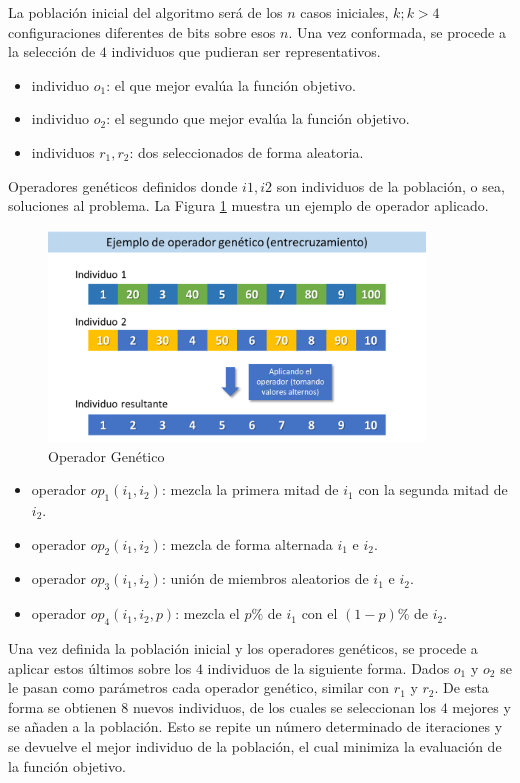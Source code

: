 \documentclass[a4paper,openright,11pt,oneside]{book}
\begin{document}
		La población inicial del algoritmo será de los $n$ casos iniciales, $k; k > 4$ configuraciones diferentes de bits sobre esos $n$. Una vez conformada, se procede a la selección de $4$ individuos que pudieran ser representativos.
		
		\begin{itemize}
			\item individuo $o_1$: el que mejor evalúa la función objetivo.
			\item individuo $o_2$: el segundo que mejor evalúa la función objetivo.
			\item individuos $r_1, r_2$: dos seleccionados de forma aleatoria.
		\end{itemize} 
	
		Operadores genéticos definidos donde $i1, i2$ son individuos de la población, o sea, soluciones al problema. La Figura \ref{OperadorGenetico} muestra un ejemplo de operador aplicado.
		
		\begin{figure}[h]
			\centering
			\includegraphics[width=10cm]{./Graphics/OperadordeGenetico.png}
			\caption{Operador Genético}
			\label{OperadorGenetico}
		\end{figure}
		
		\begin{itemize}
			\item operador $op_1(i_1, i_2)$: mezcla la primera mitad de $i_1$ con la segunda mitad de $i_2$.
			\item operador $op_2(i_1, i_2)$: mezcla de forma alternada $i_1$ e $i_2$.
			\item operador $op_3(i_1, i_2)$: unión de miembros aleatorios de $i_1$ e $i_2$.
			\item operador $op_4(i_1, i_2, p)$: mezcla el $p\%$ de $i_1$ con el $(1-p)\%$ de $i_2$.
		\end{itemize}
	
		Una vez definida la población inicial y los operadores genéticos, se procede a aplicar estos últimos sobre los $4$ individuos de la siguiente forma. Dados $o_1$ y $o_2$ se le pasan como parámetros cada operador genético, similar con $r_1$ y $r_2$. De esta forma se obtienen $8$ nuevos individuos, de los cuales se seleccionan los $4$ mejores y se añaden a la población. Esto se repite un número determinado de iteraciones y se devuelve el mejor individuo de la población, el cual minimiza la evaluación de la función objetivo.
		
\end{document}
